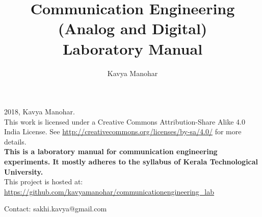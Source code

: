 \documentclass{book}
\begin{document}
\thispagestyle{empty}
\thispagestyle{empty}

\title{Communication Engineering\\ (Analog and Digital)\\
Laboratory Manual}
\author{Kavya Manohar} {%
\maketitle
  
\noindent \textcopyright{}2018, Kavya Manohar.\\
\noindent
This work is licensed under a Creative Commons Attribution-Share Alike 4.0 India License. See \url{http://creativecommons.org/licenses/by-sa/4.0/} for more details.
\\[5cm]

\noindent \textbf{This is a laboratory manual for communication engineering experiments. It mostly adheres to the syllabus of Kerala Technological University.}
\\

\noindent This project is hosted at:  \url{https://github.com/kavyamanohar/communicationengineering_lab}


\noindent Contact: sakhi.kavya@gmail.com


\clearpage
\thispagestyle{plain}







\thispagestyle{empty}
\tableofcontents
\thispagestyle{empty}
\thispagestyle{empty}

\listoffigures
\thispagestyle{empty}












}
\end{document}
